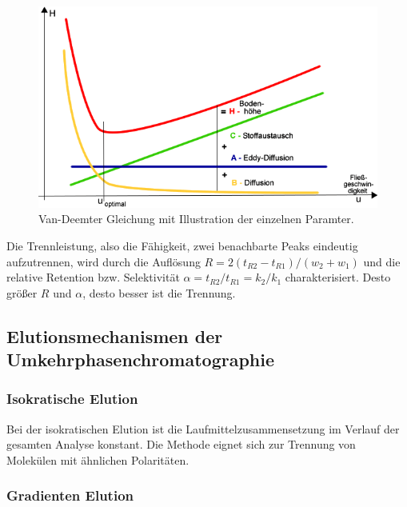       \begin{figure}[H]
        \includegraphics[scale=0.4, center]{images/VanDeemterGleichung.png} 
        \caption[Van-Deemter Gleichung, Quelle:  (Zugegriffen am 07.01.2020)]{Van-Deemter Gleichung mit Illustration der einzelnen Paramter.}
        \label{fig:VanDeemterGleichung}
      \end{figure}    
    
    Die Trennleistung, also die Fähigkeit, zwei benachbarte Peaks eindeutig aufzutrennen, wird durch die Auflösung $R = 2\left(t_{R2} - t_{R1}\right) / \left(w_2 + w_1\right)$ und die relative Retention bzw. Selektivität $\alpha = t_{R2} / t_{R1} = k_2 / k_1$ charakterisiert. Desto größer $R$ und $\alpha$, desto  besser ist die Trennung. \citep{Versuchsvorschrift}
    
  \subsection{Elutionsmechanismen der Umkehrphasenchromatographie}
  
    \subsubsection{Isokratische Elution}
    
      Bei der isokratischen Elution ist die Laufmittelzusammensetzung im Verlauf der gesamten Analyse konstant. Die Methode eignet sich zur Trennung von Molekülen mit ähnlichen Polaritäten.  \citep{SkriptHPLC}
      
    \subsubsection{Gradienten Elution}
      
